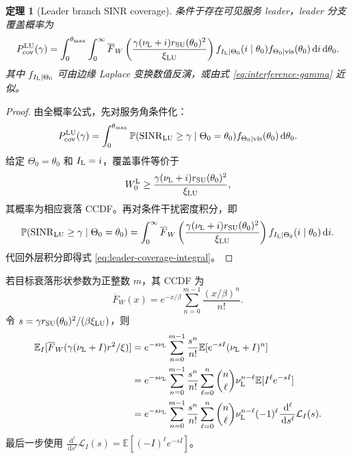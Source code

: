 \documentclass[UTF8,a4paper,11pt]{ctexart}
\newtheorem{theorem}{定理}[section]
\newcommand{\E}{\mathbb E}
\newcommand{\Prob}{\mathbb P}
\newcommand{\dd}{\,\mathrm d}
\newcommand{\SINR}{\operatorname{SINR}}
\newcommand{\thetam}{\theta_{\max}}
\newcommand{\Lcal}{\mathcal L}
\begin{document}
\begin{theorem}[Leader branch SINR coverage]
\label{thm:leader-coverage}
条件于存在可见服务 leader，leader 分支覆盖概率为
\begin{equation}
\begin{split}
 P_{\rm cov}^{\rm LU}(\gamma)
 =
 \int_0^{\thetam}\int_0^\infty
 \overline F_W\left(
 \frac{\gamma(\nu_{\rm L}+i)r_{\rm SU}(\theta_0)^2}{\xi_{\rm LU}}
 \right)
 f_{I_{\rm L}\mid\Theta_0}(i\mid\theta_0)
 f_{\Theta_0\mid{\rm vis}}(\theta_0)
 \dd i\dd\theta_0.
\end{split}
\label{eq:leader-coverage-integral}
\end{equation}
其中 $f_{I_{\rm L}\mid\Theta_0}$ 可由边缘 Laplace 变换数值反演，或由式
\eqref{eq:interference-gamma} 近似。
\end{theorem}

\begin{proof}
由全概率公式，先对服务角条件化：
\begin{equation}
 P_{\rm cov}^{\rm LU}(\gamma)
 =
 \int_0^{\thetam}
 \Prob(\SINR_{\rm LU}\geq\gamma\mid\Theta_0=\theta_0)
 f_{\Theta_0\mid{\rm vis}}(\theta_0)\dd\theta_0.
\end{equation}
给定 $\Theta_0=\theta_0$ 和 $I_{\rm L}=i$，覆盖事件等价于
\begin{equation}
 W_0^{\rm L}
 \geq
 \frac{\gamma(\nu_{\rm L}+i)r_{\rm SU}(\theta_0)^2}{\xi_{\rm LU}},
\end{equation}
其概率为相应衰落 CCDF。再对条件干扰密度积分，即
\begin{equation}
\begin{split}
 \Prob(\SINR_{\rm LU}\geq\gamma\mid\Theta_0=\theta_0)
 =
 \int_0^\infty
 \overline F_W\left(
 \frac{\gamma(\nu_{\rm L}+i)r_{\rm SU}(\theta_0)^2}{\xi_{\rm LU}}
 \right)
 f_{I_{\rm L}\mid\Theta_0}(i\mid\theta_0)\dd i.
\end{split}
\end{equation}
代回外层积分即得式 \eqref{eq:leader-coverage-integral}。
\end{proof}

若目标衰落形状参数为正整数 $m$，其 CCDF 为
\begin{equation}
 \overline F_W(x)
 =e^{-x/\beta}\sum_{n=0}^{m-1}\frac{(x/\beta)^n}{n!}.
 \label{eq:integer-gamma-ccdf}
\end{equation}
令 $s=\gamma r_{\rm SU}(\theta_0)^2/(\beta\xi_{\rm LU})$，则
\begin{equation}
\begin{split}
 \E_I[\overline F_W(\gamma(\nu_{\rm L}+I)r^2/\xi)]
 &=
 e^{-s\nu_{\rm L}}
 \sum_{n=0}^{m-1}\frac{s^n}{n!}
 \E[e^{-sI}(\nu_{\rm L}+I)^n]\\
 &=
 e^{-s\nu_{\rm L}}
 \sum_{n=0}^{m-1}\frac{s^n}{n!}
 \sum_{\ell=0}^{n}\binom n\ell
 \nu_{\rm L}^{n-\ell}\E[I^\ell e^{-sI}]\\
 &=
 e^{-s\nu_{\rm L}}
 \sum_{n=0}^{m-1}\frac{s^n}{n!}
 \sum_{\ell=0}^{n}\binom n\ell
 \nu_{\rm L}^{n-\ell}
 (-1)^\ell
 \frac{\dd^\ell}{\dd s^\ell}\Lcal_I(s).
\end{split}
\label{eq:coverage-lt-derivative}
\end{equation}
最后一步使用
$\frac{\dd^\ell}{\dd s^\ell}\Lcal_I(s)
=\E[(-I)^\ell e^{-sI}]$。
\end{document}
